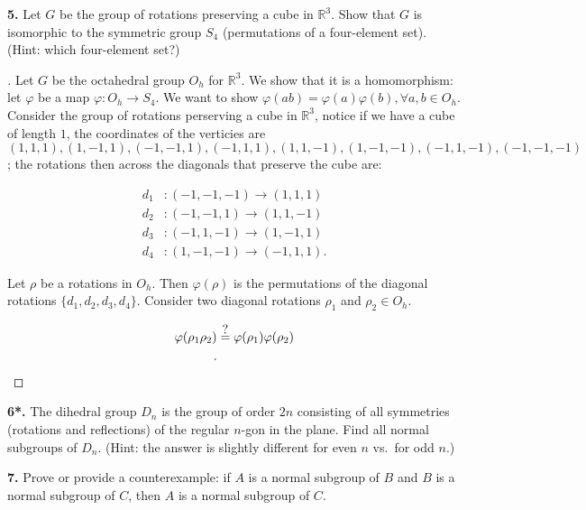 \documentclass[11pt,letterpaper]{article}
\def\R{\mathbb{R}}
\begin{document}
{\bf 5.} Let $G$ be the group of rotations preserving a cube in $\R^3$.
Show that $G$ is isomorphic to the symmetric group $S_4$ (permutations of a 
four-element set). (Hint: which four-element set?)
\medskip

\begin{proof}[]
Let \( G \) be the octahedral group \( O_h \) for \( \mathbb{R}^3 \). We show that it is a homomorphism: let \( \varphi  \) be a map \( \varphi  : O_h \to S_{4} \). We want to show \( \varphi (ab)=\varphi (a)\varphi (b) , \forall a,b\in O_h\). Consider the group of rotations perserving a cube in \( \mathbb{R}^3 \), notice if we have a cube of length \( 1 \), the coordinates of the verticies are \( (1,1,1),(1,-1,1),(-1,-1,1),(-1,1,1),(1,1,-1),(1,-1,-1),(-1,1,-1),(-1,-1,-1) \); the rotations then across the diagonals that preserve the cube are:

\begin{align*}
d_1 &: (-1,-1,-1) \to (1,1,1) \\
d_2 &: (-1,-1,1) \to (1,1,-1) \\
d_3 &: (-1,1,-1) \to (1,-1,1) \\
d_4 &: (1,-1,-1) \to (-1,1,1).
\end{align*}

Let \( \rho  \) be a rotations in \( O_h \). Then \( \varphi (\rho ) \) is the permutations of the diagonal rotations \(\{d_{1},d_{2},d_{3},d_{4}\} \). Consider two diagonal rotations \( \rho_{1}\) and \( \rho_{2} \in O_h\). 



\begin{align*}
  \varphi (\rho_{1} \rho_{2}) &\stackrel{\mathclap{\normalfont\mbox{?}}}{=} \varphi (\rho_{1}) \varphi (\rho_{2})\\
.\end{align*}


\end{proof}


{\bf 6*.} The dihedral group $D_n$ is the group of order $2n$
consisting of all symmetries (rotations and reflections) of the regular $n$-gon in the plane.
Find all normal subgroups of $D_n$. (Hint: the answer is slightly different
for even $n$ vs.\ for odd $n$.)
\medskip

{\bf 7.} Prove or provide a counterexample: if $A$ is a normal subgroup of
$B$ and $B$ is a normal subgroup of $C$, then $A$ is a normal subgroup of
$C$.
\medskip
\end{document}
